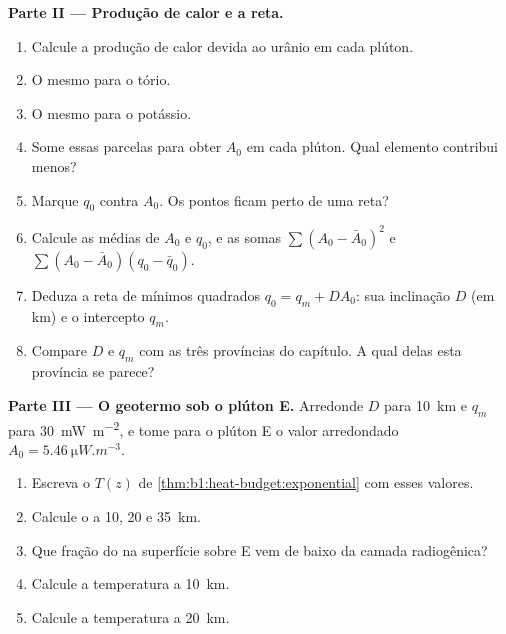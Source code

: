 \begin{problem}
\noindent\textbf{Parte II --- Produção de calor e a reta.}
\begin{enumerate}[resume]
  \item Calcule a produção de calor devida ao urânio em cada plúton.
  \item O mesmo para o tório.
  \item O mesmo para o potássio.
  \item Some essas parcelas para obter $A_0$ em cada plúton. Qual elemento contribui
        menos?
  \item Marque $q_0$ contra $A_0$. Os pontos ficam perto de uma reta?
  \item Calcule as médias de $A_0$ e $q_0$, e as somas
        $\sum (A_0 - \bar A_0)^2$ e $\sum (A_0 - \bar A_0)(q_0 - \bar q_0)$.
  \item Deduza a reta de mínimos quadrados $q_0 = q_m + D A_0$: sua inclinação $D$ (em
        \unit{km}) e o intercepto $q_m$.
  \item Compare $D$ e $q_m$ com as três províncias do capítulo. A qual delas
        esta província se parece?
\end{enumerate}

\noindent\textbf{Parte III --- O geotermo sob o plúton E.}
Arredonde $D$ para \qty{10}{km} e $q_m$ para \qty{30}{mW.m^{-2}}, e tome para
o plúton E o valor arredondado $A_0 = \qty{5.46}{\micro W.m^{-3}}$.
\begin{enumerate}[resume]
  \item Escreva o  $T(z)$ de \cref{thm:b1:heat-budget:exponential} com
        esses valores.
  \item Calcule o  a 10, 20 e \qty{35}{km}.
  \item Que fração do  na superfície sobre E vem de baixo da
        camada radiogênica?
  \item Calcule a temperatura a \qty{10}{km}.
  \item Calcule a temperatura a \qty{20}{km}.
\end{enumerate}


\end{problem}
